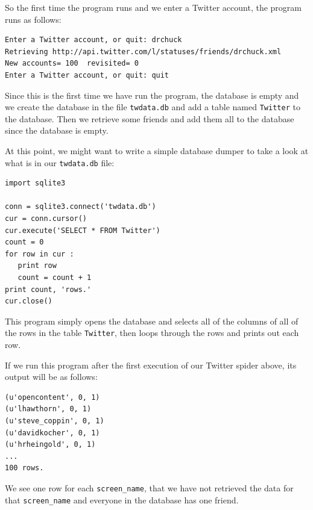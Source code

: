 \documentclass[10pt]{book}
\begin{document}
So the first time the program runs and we enter a Twitter account, the program
runs as follows:
\beforeverb
\begin{verbatim}
Enter a Twitter account, or quit: drchuck
Retrieving http://api.twitter.com/l/statuses/friends/drchuck.xml
New accounts= 100  revisited= 0
Enter a Twitter account, or quit: quit
\end{verbatim}
\afterverb
%
Since this is the first time we have run the program, the database
is empty and we create the database in the file {\tt twdata.db} and
add a table named {\tt Twitter} to the database.  Then we retrieve
some friends and add them all to the database since the database is
empty.

At this point, we might want to write a simple database dumper
to take a look at what is in our {\tt twdata.db} file:
\beforeverb
\begin{verbatim}
import sqlite3

conn = sqlite3.connect('twdata.db')
cur = conn.cursor()
cur.execute('SELECT * FROM Twitter')
count = 0
for row in cur :
   print row
   count = count + 1
print count, 'rows.'
cur.close()
\end{verbatim}
\afterverb
%
This program simply opens the database and selects all of the 
columns of all of the rows in the table {\tt Twitter}, then 
loops through the rows and prints out each row.

If we run this program after the first execution of our Twitter
spider above, its output will be as follows:
\beforeverb
\begin{verbatim}
(u'opencontent', 0, 1)
(u'lhawthorn', 0, 1)
(u'steve_coppin', 0, 1)
(u'davidkocher', 0, 1)
(u'hrheingold', 0, 1)
...
100 rows.
\end{verbatim}
\afterverb
%
We see one row for each \verb"screen_name", that we 
have not retrieved the data for that \verb"screen_name" and 
everyone in the database has one friend.
\end{document}
